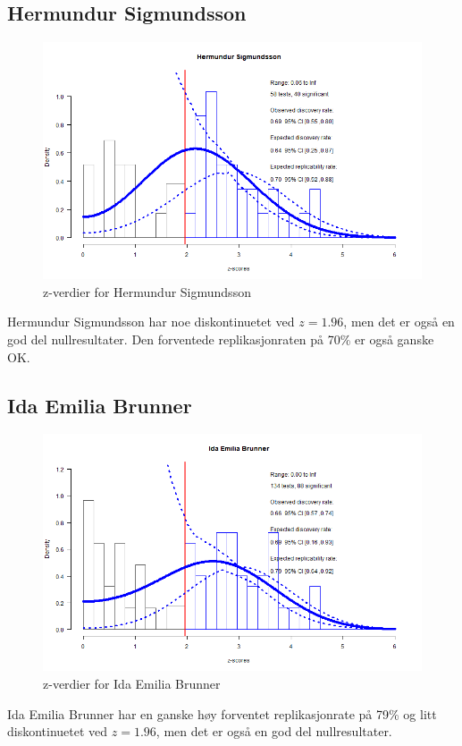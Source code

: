 \documentclass[doc,norsk]{apa7}
\begin{document}
\subsection{Hermundur Sigmundsson}
\begin{figure}[h!]
    \centering
    \includegraphics[width=\textwidth]{images/Hermundur Sigmundsson.png}
    \caption{z-verdier for Hermundur Sigmundsson}
\end{figure}
Hermundur Sigmundsson har noe diskontinuetet ved $z=1.96$, men det er også en god del nullresultater. Den forventede replikasjonraten på 70\% er også ganske OK.

\subsection{Ida Emilia Brunner}
\begin{figure}[h!]
    \centering
    \includegraphics[width=\textwidth]{images/Ida Emilia Brunner.png}
    \caption{z-verdier for Ida Emilia Brunner}
\end{figure}
Ida Emilia Brunner har en ganske høy forventet replikasjonrate på 79\% og litt diskontinuetet ved $z=1.96$, men det er også en god del nullresultater.
\end{document}
